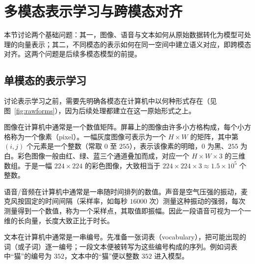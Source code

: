\section{多模态表示学习与跨模态对齐}
\label{sec:repr}

本节讨论两个基础问题：其一，图像、语音与文本如何从原始数据转化为模型可处理的向量表示；其二，不同模态的表示如何在同一空间中建立语义对应，即跨模态对齐。这两个问题是后续多模态模型的前提。

\subsection{单模态的表示学习}
\label{sub:encode}

讨论表示学习之前，需要先明确各模态在计算机中以何种形式存在（见图~\ref{fig:rawforms}），因为后续处理都建立在这一原始形式之上。

图像在计算机中通常是一个数值矩阵。屏幕上的图像由许多小方格构成，每个小方格称为一个像素（pixel）。一幅灰度图像可表示为一个 $H\times W$ 的矩阵，其中第 $(i,j)$ 个元素是一个整数（常取 $0$ 至 $255$），表示该像素的明暗，$0$ 为黑、$255$ 为白。彩色图像一般由红、绿、蓝三个通道叠加而成，对应一个 $H\times W\times 3$ 的三维数组。于是一幅 $224\times224$ 的彩色图像，大致相当于 $224\times224\times3\approx 1.5\times10^{5}$ 个整数。

语音/音频在计算机中通常是一串随时间排列的数值。声音是空气压强的振动，麦克风按固定的时间间隔（采样率，如每秒 $16000$ 次）测量这种振动的强弱，每次测量得到一个数值，称为一个采样点，其取值即振幅。因此一段语音可视为一个一维的长向量，长度大致正比于时长。

文本在计算机中通常是一串编号。先准备一张词表（vocabulary），把可能出现的词（或子词）逐一编号；一段文本便被转写为这些编号构成的序列。例如词表中“猫”的编号为 $352$，文本中的“猫”便以整数 $352$ 进入模型。

